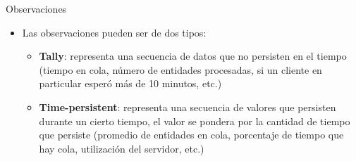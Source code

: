 \begin{frame}{Observaciones}
    \begin{itemize}
            \item Las observaciones pueden ser de dos tipos:
        \begin{itemize}
            \item \textbf{Tally}: representa una secuencia de datos que no persisten en el tiempo (tiempo en cola, número de entidades procesadas, si un cliente en particular esperó más de 10 minutos, etc.) 
            \item \textbf{Time-persistent}: representa una secuencia de valores que persisten durante un cierto tiempo, el valor se pondera por la cantidad de tiempo que persiste (promedio de entidades en cola, porcentaje de tiempo que hay cola, utilización del servidor, etc.)
        \end{itemize}
    \end{itemize}
\end{frame}